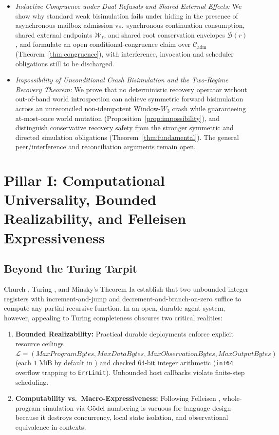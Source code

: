 \documentclass[11pt,a4paper]{article}
\theoremstyle{definition}
\theoremstyle{remark}
\begin{document}
\begin{enumerate}
\begin{itemize}
    \item \emph{Inductive Congruence under Dual Refusals and Shared External Effects:} We show why standard weak bisimulation fails under hiding in the presence of asynchronous mailbox admission vs.\ synchronous continuation consumption, shared external endpoints $\mathcal{W}_\ell$, and shared root conservation envelopes $\mathcal{B}(r)$, and formulate an open conditional-congruence claim over $\mathcal{C}_{\text{adm}}$ (Theorem~\ref{thm:congruence}), with interference, invocation and scheduler obligations still to be discharged.
    \item \emph{Impossibility of Unconditional Crash Bisimulation and the Two-Regime Recovery Theorem:} We prove that no deterministic recovery operator without out-of-band world introspection can achieve symmetric forward bisimulation across an unreconciled non-idempotent Window-$W_3$ crash while guaranteeing at-most-once world mutation (Proposition~\ref{prop:impossibility}), and distinguish conservative recovery safety from the stronger symmetric and directed simulation obligations (Theorem~\ref{thm:fundamental}). The general peer/interference and reconciliation arguments remain open.
  \end{itemize}
\end{enumerate}

\section{Pillar I: Computational Universality, Bounded Realizability, and Felleisen Expressiveness}

\subsection{Beyond the Turing Tarpit}
Church \cite{church1936unsolvable}, Turing \cite{turing1936computable}, and Minsky's Theorem Ia \cite{minsky1961recursive} establish that two unbounded integer registers with increment-and-jump and decrement-and-branch-on-zero suffice to compute any partial recursive function. In an open, durable agent system, however, appealing to Turing completeness obscures two critical realities:
\begin{enumerate}
  \item \textbf{Bounded Realizability:} Practical durable deployments enforce explicit resource ceilings $\mathcal{L} = (\mathit{MaxProgramBytes}, \mathit{MaxDataBytes}, \mathit{MaxObservationBytes}, \mathit{MaxOutputBytes})$ (each $1\text{ MiB}$ by default in ) and checked 64-bit integer arithmetic (\texttt{int64} overflow trapping to \texttt{ErrLimit}). Unbounded host callbacks violate finite-step scheduling.
  \item \textbf{Computability vs.\ Macro-Expressiveness:} Following Felleisen \cite{felleisen1991expressive}, whole-program simulation via Gödel numbering is vacuous for language design because it destroys concurrency, local state isolation, and observational equivalence in contexts.
\end{enumerate}
\end{document}
